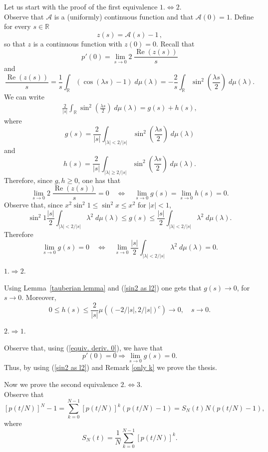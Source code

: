 \documentclass[aip,jmp
]{revtex4}
\renewcommand{\Re}{\mathop{\mathrm{Re}}\nolimits}
\newcommand{\RM}{\mathbb{R}}
\theoremstyle{definition}
\begin{document}
Let us start with the proof of the first equivalence $1. \Leftrightarrow 2.$\\
Observe that $\mathcal{A}$ is a (uniformly) continuous function and that $\mathcal{A}(0)=1$. Define for every $s \in \RM$
$$
z(s)=\mathcal{A}(s)-1\,,
$$
so that $z$ is a continuous function with $z(0)=0$.
Recall that
\begin{equation}\label{rel dA e dp}
p'(0)=\lim_{s \to 0} 2 \; \frac{\Re (z(s))}{s}
\end{equation}
and
$$
\frac{\Re (z(s))}{s} =\frac{1}{s} \int_{\RM} \left(\cos(\lambda s)-1\right)\; d\mu(\lambda)=-\frac{2}{s} \int_{\RM} \sin^2 \left(\frac{\lambda s}{2}\right) \; d\mu(\lambda) .
$$
We can write
\begin{eqnarray*}
\frac{2}{|s|} \int_{\RM} \sin^2 \left(\frac{\lambda s}{2}\right)\; d\mu(\lambda)
= g(s)+h(s) ,
\end{eqnarray*}
where
$$
g(s)=\frac{2}{|s|} \int_{|\lambda|<2/|s|} \sin^2 \left(\frac{\lambda s}{2}\right) \; d\mu(\lambda)
$$
and
$$
h(s)=\frac{2}{|s|} \int_{|\lambda|\geq 2/|s|} \sin^2 \left(\frac{\lambda s}{2}\right)\; d\mu(\lambda) .
$$
Therefore, since $g,h \geq 0$, one has that
\begin{equation}\label{equiv. deriv. 0}
\lim_{s \to 0} 2 \;\frac{\Re (z(s))}{s}=0 \quad \Leftrightarrow \quad \lim_{s \to 0} g(s)=\lim_{s \to 0} h(s)=0.
\end{equation}
Observe that, since $x^2 \sin^2 1 \leq \sin^2 x \leq x^2$ for $|x|<1$,
$$
\sin^2 1 \frac{|s|}{2} \int_{|\lambda|< 2/|s|} \lambda^2 \;d\mu(\lambda) \leq g(s) \leq \frac{|s|}{2} \int_{|\lambda|< 2/|s|}\lambda^2 \;d\mu(\lambda) .
$$
Therefore
\begin{equation}\label{sin2 as l2}
\lim_{s \to 0} g(s) = 0 \quad \Leftrightarrow \quad  \lim_{s \to 0} \frac{|s|}{2} \int_{|\lambda|< 2/|s|} \lambda^2 \;d\mu(\lambda)=0 .
\end{equation}

$1. \Rightarrow 2.$

Using Lemma~\ref{tauberian lemma} and (\ref{sin2 as l2}) one gets that $g(s) \to 0$, for $s \to 0$. Moreover,
$$
0 \leq h(s) \leq \frac{2}{|s|}\mu\left((-2/|s|,2/|s|)^c\right)\to 0, \quad s\to 0.
$$

$2. \Rightarrow 1.$

Observe that, using (\ref{equiv. deriv. 0}), we have that
$$
p'(0)=0 \Rightarrow \lim_{s \to 0} g(s)=0.
$$
Thus, by using (\ref{sin2 as l2}) and Remark \ref{only k} we prove the thesis.

Now we prove the second equivalence $2. \Leftrightarrow 3.$\\
Observe that
\begin{equation}
\label{eq:pvsS}
[p(t/N)]^N -1  =  \sum_{k=0}^{N-1}[p(t/N)]^k \left(p(t/N)-1\right)= S_{N}(t)N\left(p(t/N)-1\right),
\end{equation}
where
$$
S_{N}(t)= \frac{1}{N}\sum_{k=0}^{N-1}[p(t/N)]^k.
$$
\end{document}
